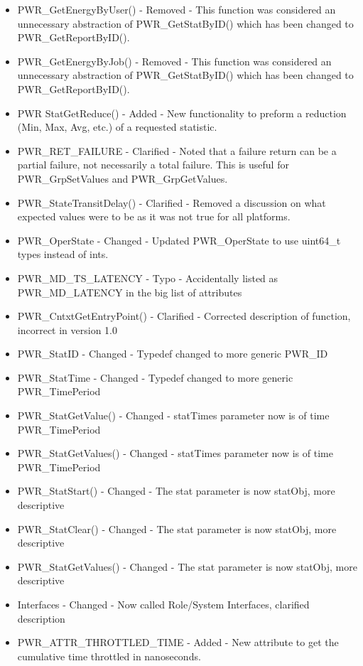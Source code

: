 \documentclass[12pt]{report} %
\begin{document}
\begin{appendices}
\begin{itemize}
    \item{PWR_GetEnergyByUser() - Removed - This function was considered an unnecessary abstraction of PWR_GetStatByID() which has been changed to PWR_GetReportByID().}
    \item{PWR_GetEnergyByJob() - Removed - This function was considered an unnecessary abstraction of PWR_GetStatByID() which has been changed to PWR_GetReportByID().}
    \item{PWR StatGetReduce() - Added - New functionality to preform a reduction (Min, Max, Avg, etc.) of a requested statistic. }
    \item{PWR_RET_FAILURE - Clarified - Noted that a failure return can be a partial failure, not necessarily a total failure. This is useful for PWR_GrpSetValues and PWR_GrpGetValues.}
    \item{PWR_StateTransitDelay() - Clarified - Removed a discussion on what expected values were to be as it was not true for all platforms.}
    \item{PWR_OperState - Changed - Updated PWR_OperState to use uint64_t types instead of ints.}
    \item{PWR_MD_TS_LATENCY - Typo - Accidentally listed as PWR_MD_LATENCY in the big list of attributes}
    \item{PWR_CntxtGetEntryPoint() - Clarified - Corrected description of function, incorrect in version 1.0}
    \item{PWR_StatID - Changed - Typedef changed to more generic PWR_ID}
    \item{PWR_StatTime - Changed - Typedef changed to more generic PWR_TimePeriod}
    \item{PWR_StatGetValue() - Changed - statTimes parameter now is of time PWR_TimePeriod}
    \item{PWR_StatGetValues() - Changed - statTimes parameter now is of time PWR_TimePeriod}
    \item{PWR_StatStart() - Changed - The stat parameter is now statObj, more descriptive}
    \item{PWR_StatClear() - Changed - The stat parameter is now statObj, more descriptive}
    \item{PWR_StatGetValues() - Changed  - The stat parameter is now statObj, more descriptive}
    \item{Interfaces - Changed - Now called Role/System Interfaces, clarified description}
    \item{PWR_ATTR_THROTTLED_TIME - Added - New attribute to get the cumulative time throttled in nanoseconds.}

\end{itemize}
\end{appendices}
\end{document}
